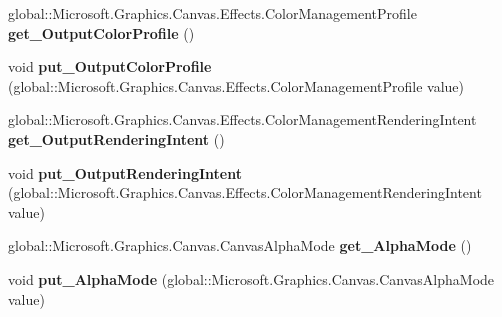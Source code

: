 \begin{DoxyCompactItemize}
\item 
\mbox{\label{class_microsoft_1_1_graphics_1_1_canvas_1_1_effects_1_1_color_management_effect_a74ae08e1f5d954e1f9d89ddd5af9653d}} 
global\+::\+Microsoft.\+Graphics.\+Canvas.\+Effects.\+Color\+Management\+Profile {\bfseries get\+\_\+\+Output\+Color\+Profile} ()
\item 
\mbox{\label{class_microsoft_1_1_graphics_1_1_canvas_1_1_effects_1_1_color_management_effect_a8cc3db4456f5009c8bb5932d1ba34690}} 
void {\bfseries put\+\_\+\+Output\+Color\+Profile} (global\+::\+Microsoft.\+Graphics.\+Canvas.\+Effects.\+Color\+Management\+Profile value)
\item 
\mbox{\label{class_microsoft_1_1_graphics_1_1_canvas_1_1_effects_1_1_color_management_effect_ab3f873d532a7ac2daad8c8891c039b7b}} 
global\+::\+Microsoft.\+Graphics.\+Canvas.\+Effects.\+Color\+Management\+Rendering\+Intent {\bfseries get\+\_\+\+Output\+Rendering\+Intent} ()
\item 
\mbox{\label{class_microsoft_1_1_graphics_1_1_canvas_1_1_effects_1_1_color_management_effect_a18c1f342b105332ae8a95cb11dcba930}} 
void {\bfseries put\+\_\+\+Output\+Rendering\+Intent} (global\+::\+Microsoft.\+Graphics.\+Canvas.\+Effects.\+Color\+Management\+Rendering\+Intent value)
\item 
\mbox{\label{class_microsoft_1_1_graphics_1_1_canvas_1_1_effects_1_1_color_management_effect_a8345f14c6facbde7cb0800f962ecaa00}} 
global\+::\+Microsoft.\+Graphics.\+Canvas.\+Canvas\+Alpha\+Mode {\bfseries get\+\_\+\+Alpha\+Mode} ()
\item 
\mbox{\label{class_microsoft_1_1_graphics_1_1_canvas_1_1_effects_1_1_color_management_effect_a09ffed53f704cbca9f184fd3d5872f77}} 
void {\bfseries put\+\_\+\+Alpha\+Mode} (global\+::\+Microsoft.\+Graphics.\+Canvas.\+Canvas\+Alpha\+Mode value)

\end{DoxyCompactItemize}
